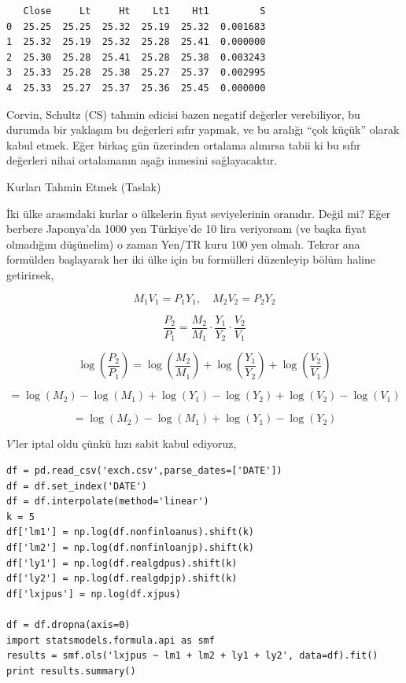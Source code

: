 \documentclass[12pt,fleqn]{article}\usepackage{../../common}
\begin{document}
\begin{verbatim}
   Close     Lt     Ht    Lt1    Ht1         S
0  25.25  25.25  25.32  25.19  25.32  0.001683
1  25.32  25.19  25.32  25.28  25.41  0.000000
2  25.30  25.28  25.41  25.28  25.38  0.003243
3  25.33  25.28  25.38  25.27  25.37  0.002995
4  25.33  25.27  25.37  25.36  25.45  0.000000
\end{verbatim}

Corvin, Schultz (CS) tahmin edicisi bazen negatif değerler verebiliyor, bu
durumda bir yaklaşım bu değerleri sıfır yapmak, ve bu aralığı ``çok küçük''
olarak kabul etmek. Eğer birkaç gün üzerinden ortalama alınırsa tabii ki bu
sıfır değerleri nihai ortalamanın aşağı inmesini sağlayacaktır. 


\newpage

Kurları Tahmin Etmek (Taslak)

İki ülke arasındaki kurlar o ülkelerin fiyat seviyelerinin oranıdır. Değil
mi? Eğer berbere Japonya'da 1000 yen Türkiye'de 10 lira veriyorsam (ve
başka fiyat olmadığını düşünelim) o zaman Yen/TR kuru 100 yen
olmalı. Tekrar ana formülden başlayarak her iki ülke için bu formülleri
düzenleyip bölüm haline getirirsek,

$$ M_1V_1 = P_1Y_1, \quad M_2V_2 = P_2Y_2 $$

$$ \frac{P_2}{P_1} = \frac{M_2}{M_1} \cdot \frac{Y_1}{Y_2} \cdot \frac{V_2}{V_1} $$

$$ \log \left( \frac{P_2}{P_1} \right) = 
\log \left( \frac{M_2}{M_1} \right) + 
\log \left( \frac{Y_1}{Y_2} \right) +
\log \left( \frac{V_2}{V_1} \right) 
$$

$$    = \log(M_2) - \log(M_1) + \log(Y_1) - \log(Y_2)  + \log(V_2) - \log(V_1) $$

$$ = \log(M_2) - \log(M_1) + \log(Y_1) - \log(Y_2)  $$

$V$'ler iptal oldu çünkü hızı sabit kabul ediyoruz, 


\begin{verbatim}
df = pd.read_csv('exch.csv',parse_dates=['DATE'])
df = df.set_index('DATE')
df = df.interpolate(method='linear')
k = 5
df['lm1'] = np.log(df.nonfinloanus).shift(k)
df['lm2'] = np.log(df.nonfinloanjp).shift(k)
df['ly1'] = np.log(df.realgdpus).shift(k)
df['ly2'] = np.log(df.realgdpjp).shift(k)
df['lxjpus'] = np.log(df.xjpus)

df = df.dropna(axis=0)
import statsmodels.formula.api as smf
results = smf.ols('lxjpus ~ lm1 + lm2 + ly1 + ly2', data=df).fit()
print results.summary()
\end{verbatim}
\end{document}
